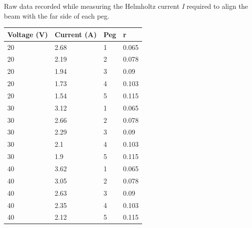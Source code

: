 \documentclass[letterpaper]{article}
\begin{document}
Raw data recorded while measuring the Helmholtz current \textit{I} required
to align the beam with the far side of each peg.
\begin{table}[H]
\centering
\begin{tabular}{|l|l|l|l|}
\hline
Voltage (V) & Current (A) & Peg & r     \\ \hline
20          & 2.68        & 1   & 0.065 \\ \hline
20          & 2.19        & 2   & 0.078 \\ \hline
20          & 1.94        & 3   & 0.09  \\ \hline
20          & 1.73        & 4   & 0.103 \\ \hline
20          & 1.54        & 5   & 0.115 \\ \hline
30          & 3.12        & 1   & 0.065 \\ \hline
30          & 2.66        & 2   & 0.078 \\ \hline
30          & 2.29        & 3   & 0.09  \\ \hline
30          & 2.1         & 4   & 0.103 \\ \hline
30          & 1.9         & 5   & 0.115 \\ \hline
40          & 3.62        & 1   & 0.065 \\ \hline
40          & 3.05        & 2   & 0.078 \\ \hline
40          & 2.63        & 3   & 0.09  \\ \hline
40          & 2.35        & 4   & 0.103 \\ \hline
40          & 2.12        & 5   & 0.115 \\ \hline
\end{tabular}
\label{Raw data recorded when measuring the Helmholtz current}
\end{table}
\end{document}
